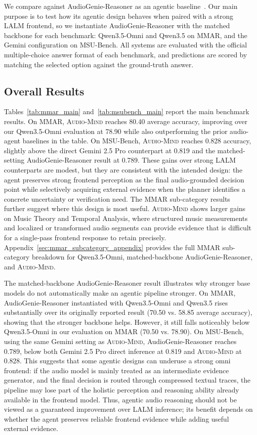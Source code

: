\documentclass[11pt]{article}
\newcommand{\ours}{\textsc{Audio-Mind}}
\begin{document}
We compare against AudioGenie-Reasoner as an agentic baseline~\citep{rong2025audiogenie}. Our main purpose is to test how its agentic design behaves when paired with a strong LALM frontend, so we instantiate AudioGenie-Reasoner with the matched backbone for each benchmark: Qwen3.5-Omni and Qwen3.5 on MMAR, and the Gemini configuration on MSU-Bench. All systems are evaluated with the official multiple-choice answer format of each benchmark, and predictions are scored by matching the selected option against the ground-truth answer.


\subsection{Overall Results}
\label{sec:mmar_results}

Tables~\ref{tab:mmar_main} and~\ref{tab:msubench_main} report the main benchmark results. On MMAR, \ours{} reaches 80.40 average accuracy, improving over our Qwen3.5-Omni evaluation at 78.90 while also outperforming the prior audio-agent baselines in the table. On MSU-Bench, \ours{} reaches 0.828 accuracy, slightly above the direct Gemini 2.5 Pro counterpart at 0.819 and the matched-setting AudioGenie-Reasoner result at 0.789. These gains over strong LALM counterparts are modest, but they are consistent with the intended design: the agent preserves strong frontend perception as the final audio-grounded decision point while selectively acquiring external evidence when the planner identifies a concrete uncertainty or verification need. The MMAR sub-category results further suggest where this design is most useful. \ours{} shows larger gains on Music Theory and Temporal Analysis, where structured music measurements and localized or transformed audio segments can provide evidence that is difficult for a single-pass frontend response to retain precisely. Appendix~\ref{sec:mmar_subcategory_appendix} provides the full MMAR sub-category breakdown for Qwen3.5-Omni, matched-backbone AudioGenie-Reasoner, and \ours{}.

The matched-backbone AudioGenie-Reasoner result illustrates why stronger base models do not automatically make an agentic pipeline stronger. On MMAR, AudioGenie-Reasoner instantiated with Qwen3.5-Omni and Qwen3.5 rises substantially over its originally reported result (70.50 vs. 58.85 average accuracy), showing that the stronger backbone helps. However, it still falls noticeably below Qwen3.5-Omni in our evaluation on MMAR (70.50 vs. 78.90). On MSU-Bench, using the same Gemini setting as \ours{}, AudioGenie-Reasoner reaches 0.789, below both Gemini 2.5 Pro direct inference at 0.819 and \ours{} at 0.828. This suggests that some agentic designs can underuse a strong omni frontend: if the audio model is mainly treated as an intermediate evidence generator, and the final decision is routed through compressed textual traces, the pipeline may lose part of the holistic perception and reasoning ability already available in the frontend model. Thus, agentic audio reasoning should not be viewed as a guaranteed improvement over LALM inference; its benefit depends on whether the agent preserves reliable frontend evidence while adding useful external evidence.
\end{document}
